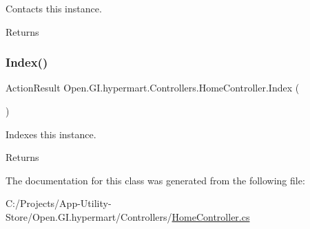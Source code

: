 Contacts this instance. 

\begin{DoxyReturn}{Returns}

\end{DoxyReturn}
\hypertarget{class_open_1_1_g_i_1_1hypermart_1_1_controllers_1_1_home_controller_a18ad180258caf702a7cfe51c16bf5558}{}\label{class_open_1_1_g_i_1_1hypermart_1_1_controllers_1_1_home_controller_a18ad180258caf702a7cfe51c16bf5558} 
\subsubsection{\texorpdfstring{Index()}{Index()}}
{\footnotesize\ttfamily Action\+Result Open.\+G\+I.\+hypermart.\+Controllers.\+Home\+Controller.\+Index (\begin{DoxyParamCaption}{ }\end{DoxyParamCaption})}



Indexes this instance. 

\begin{DoxyReturn}{Returns}

\end{DoxyReturn}


The documentation for this class was generated from the following file\+:\begin{DoxyCompactItemize}
\item 
C\+:/\+Projects/\+App-\/\+Utility-\/\+Store/\+Open.\+G\+I.\+hypermart/\+Controllers/\hyperlink{_home_controller_8cs}{Home\+Controller.\+cs}\end{DoxyCompactItemize}
